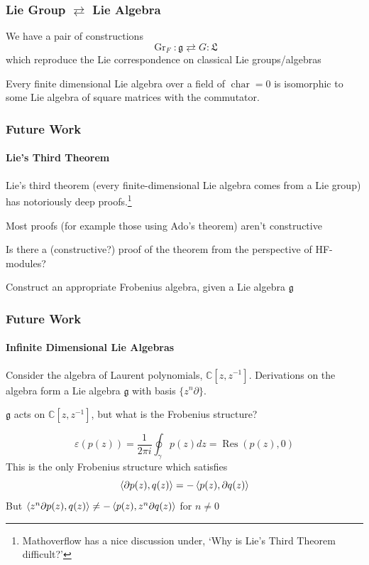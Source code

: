 \documentclass{beamer}
\begin{document}
\begin{frame}

\frametitle{Lie Group $\rightleftarrows$ Lie Algebra}

We have a pair of constructions
\begin{equation*}
\operatorname{Gr}_F: \mathfrak{g} \rightleftarrows G : \mathfrak{L}
\end{equation*}
which reproduce the Lie correspondence on classical Lie groups/algebras

\bigskip

 Every finite dimensional Lie algebra over a field of $\operatorname{char} = 0$ is isomorphic to some Lie algebra of square matrices with the commutator.


\end{frame}




\begin{frame}
\frametitle{Future Work}

\framesubtitle{Lie's Third Theorem}

 Lie's third theorem (every finite-dimensional Lie algebra comes from a Lie group) has notoriously deep proofs.\footnote{Mathoverflow has a nice discussion under, `Why is Lie's Third Theorem difficult?'} 

\medskip

Most proofs (for example those using Ado's theorem) aren't constructive

\bigskip

 Is there a (constructive?) proof of the theorem from the perspective of HF-modules?

 Construct an appropriate Frobenius algebra, given a Lie algebra $\mathfrak{g}$


\end{frame}



\begin{frame}
\frametitle{Future Work}

\framesubtitle{Infinite Dimensional Lie Algebras}


Consider the algebra of Laurent polynomials, $\mathbb{C}[z, z^{-1}]$. Derivations on the algebra form a Lie algebra $\mathfrak{g}$ with basis $\{ z^n \partial \}$.

\medskip

$\mathfrak{g}$ acts on $\mathbb{C}[z, z^{-1}]$, but what is the Frobenius structure?


\medskip

\begin{equation*}
\varepsilon(p(z)) = \dfrac{1}{2 \pi i} \oint_{\gamma} p(z) dz = \operatorname{Res}(p(z), 0)
\end{equation*}
This is the only Frobenius structure which satisfies
\begin{equation*}
\left\langle \partial p(z), q(z) \right\rangle = - \left\langle p(z), \partial q(z) \right\rangle
\end{equation*}
But $\left\langle z^n \partial p(z), q(z) \right\rangle \ne - \left\langle p(z), z^n \partial q(z) \right\rangle$ for $n \ne 0$




\end{frame}
\end{document}
